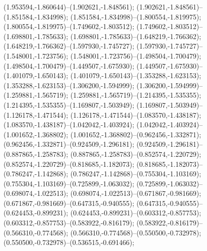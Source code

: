  (1.953594,-1.860644)--(1.902621,-1.848561);
 (1.902621,-1.848561)--(1.851584,-1.834998);
 (1.851584,-1.834998)--(1.800554,-1.819975);
 (1.800554,-1.819975)--(1.749602,-1.803512);
 (1.749602,-1.803512)--(1.698801,-1.785633);
 (1.698801,-1.785633)--(1.648219,-1.766362);
 (1.648219,-1.766362)--(1.597930,-1.745727);
 (1.597930,-1.745727)--(1.548001,-1.723756);
 (1.548001,-1.723756)--(1.498504,-1.700479);
 (1.498504,-1.700479)--(1.449507,-1.675930);
 (1.449507,-1.675930)--(1.401079,-1.650143);
 (1.401079,-1.650143)--(1.353288,-1.623153);
 (1.353288,-1.623153)--(1.306200,-1.594999);
 (1.306200,-1.594999)--(1.259881,-1.565719);
 (1.259881,-1.565719)--(1.214395,-1.535355);
 (1.214395,-1.535355)--(1.169807,-1.503949);
 (1.169807,-1.503949)--(1.126178,-1.471544);
 (1.126178,-1.471544)--(1.083570,-1.438187);
 (1.083570,-1.438187)--(1.042042,-1.403924);
 (1.042042,-1.403924)--(1.001652,-1.368802);
 (1.001652,-1.368802)--(0.962456,-1.332871);
 (0.962456,-1.332871)--(0.924509,-1.296181);
 (0.924509,-1.296181)--(0.887865,-1.258783);
 (0.887865,-1.258783)--(0.852574,-1.220729);
 (0.852574,-1.220729)--(0.818685,-1.182073);
 (0.818685,-1.182073)--(0.786247,-1.142868);
 (0.786247,-1.142868)--(0.755304,-1.103169);
 (0.755304,-1.103169)--(0.725899,-1.063032);
 (0.725899,-1.063032)--(0.698074,-1.022513);
 (0.698074,-1.022513)--(0.671867,-0.981669);
 (0.671867,-0.981669)--(0.647315,-0.940555);
 (0.647315,-0.940555)--(0.624453,-0.899231);
 (0.624453,-0.899231)--(0.603312,-0.857753);
 (0.603312,-0.857753)--(0.583922,-0.816179);
 (0.583922,-0.816179)--(0.566310,-0.774568);
 (0.566310,-0.774568)--(0.550500,-0.732978);
 (0.550500,-0.732978)--(0.536515,-0.691466);
